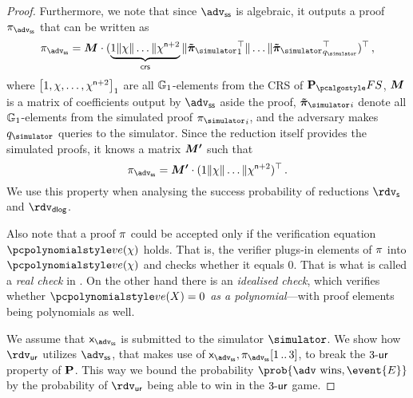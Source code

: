 \documentclass[runningheads,11pt]{llncs}
\let\spvec\vec
\let\vec\accentvec
\let\vec\spvec
\def\vec#1{\mathchoice{\mbox{\boldmath$\displaystyle#1$}}
	{\mbox{\boldmath$\textstyle#1$}}
	{\mbox{\boldmath$\scriptstyle#1$}}
	{\mbox{\boldmath$\scriptscriptstyle#1$}}}
\theoremstyle{definition}
\begin{document}
\begin{proof}
Furthermore, we note that since $\advss$ is algebraic, it outputs a proof $\zkproof_\advss$ that can be written as 
\[
	\zkproof_\advss = \vec{M} \cdot (\underbrace{1 \| \chi \| \ldots \| \chi^{\numberofconstrains + 2}}_{\crs} \| \vec{\tilde{\zkproof}_\simulator}_1^{\top} \| \ldots \| \vec{\tilde{\zkproof}_\simulator}_{q_\simulator}^\top)^\top\,,
\]
where $\left[1, \chi, \ldots, \chi^{\mathsf{n} + 2}\right]_{1}$ are all $\mathbb{G}_1$-elements from the CRS of $\plonkprotfs$, $\vec{M}$ is a matrix of coefficients output by $\advss$ aside the proof, $\vec{\tilde{\zkproof}_\simulator}_i$ denote all $\mathbb{G}_1$-elements from the simulated proof ${\zkproof_\simulator}_i$, and the adversary makes $q_\simulator$ queries to the simulator. 
Since the reduction itself provides the simulated proofs, it knows a matrix $\vec{M'}$ such that
\begin{equation}
	\label{eq:M_prim}
	\zkproof_\advss = \vec{M'} \cdot (1 \| \chi \| \ldots \| \chi^{\numberofconstrains + 2})^\top\,.
\end{equation}
We use this property when analysing the success probability of reductions $\rdvs$ and $\rdvdlog$.

Also note that a proof $\pi$ could be accepted only if the verification equation $\vereq(\chi)$ holds. That is, the verifier plugs-in elements of $\pi$ into $\vereq(\chi)$ and checks whether it equals $0$. That is what is called a \emph{real check} in \cite{EPRINT:GabWilCio19}. 
On the other hand there is an \emph{idealised check}, which verifies whether $\vereq(X) = 0$ \emph{as a polynomial}---with proof elements being polynomials as well.

We assume that $\inp_{\advss}$ is submitted to the simulator $\simulator$. 
We show how $\rdvur$ utilizes $\advss$, that makes use of $\inp_\advss, \zkproof_{\advss}\range{1}{3}$, to break the ${3\text{-}\mathsf{ur}}$ property of $\mathbf{P}$. 
This way we bound the probability $\prob{\adv \text{ wins}, \event{E}}$ by the probability of $\rdvur$ being able to win in the ${3\text{-}\mathsf{ur}}$ game.


\end{proof}
\end{document}
